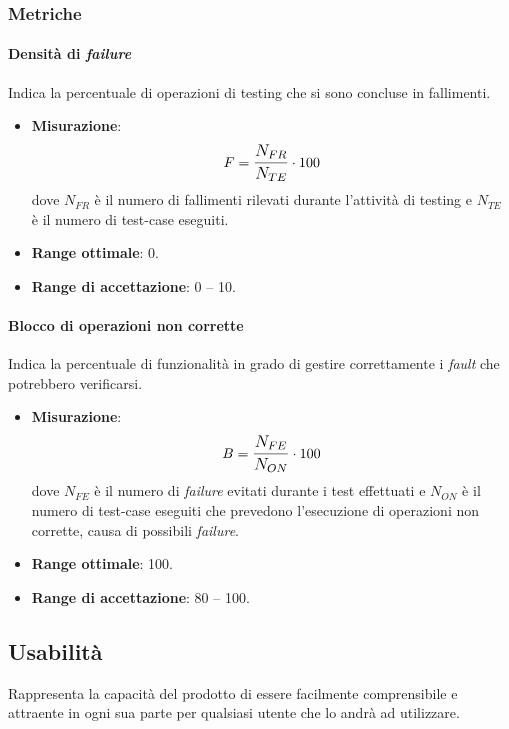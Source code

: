 \subsubsection{Metriche}
\paragraph{Densità di \textit{failure}}
Indica la percentuale di operazioni di testing che si sono concluse in fallimenti.

\begin{itemize}
	\item \textbf{Misurazione}: 
		$$F=\mathlarger{\frac{N_{FR}}{N_{TE}}} \cdot 100$$
	dove $N_{FR}$ è il numero di fallimenti rilevati durante l'attività di testing e $N_{TE}$ è il numero di test-case eseguiti.
	\item \textbf{Range ottimale}: 0.
	\item \textbf{Range di accettazione}: 0 -- 10.
\end{itemize}

\paragraph{Blocco di operazioni non corrette}
Indica la percentuale di funzionalità in grado di gestire correttamente i \textit{fault} che potrebbero verificarsi.
\begin{itemize}
	\item \textbf{Misurazione}: 
		$$B=\mathlarger{\frac{N_{FE}}{N_{ON}}} \cdot 100$$
	dove $N_{FE}$ è il numero di \textit{failure} evitati durante i test effettuati e $N_{ON}$ è il numero di test-case eseguiti che prevedono l'esecuzione di operazioni non corrette, causa di possibili \textit{failure}.
	\item \textbf{Range ottimale}: 100.
	\item \textbf{Range di accettazione}: 80 -- 100.
\end{itemize}

\subsection{Usabilità}
Rappresenta la capacità del prodotto di essere facilmente comprensibile e attraente in ogni sua parte per qualsiasi utente che lo andrà ad utilizzare.

